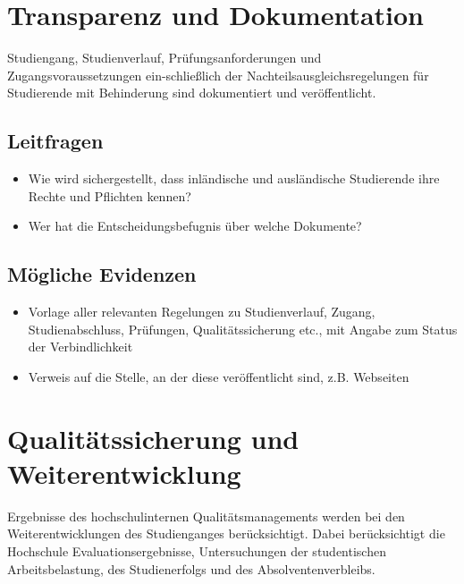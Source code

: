 %

\chapter{Transparenz und Dokumentation}\label{Transparenz und Dokumentation}


Studiengang, Studienverlauf, Prüfungsanforderungen und
Zugangsvoraussetzungen ein-schließlich der Nachteilsausgleichsregelungen
für Studierende mit Behinderung sind dokumentiert und veröffentlicht.

\section{Leitfragen}\label{leitfragen}

\begin{itemize}
\item
  Wie wird sichergestellt, dass inländische und ausländische Studierende
  ihre Rechte und Pflichten kennen?
\item
  Wer hat die Entscheidungsbefugnis über welche Dokumente?
\end{itemize}

\section{Mögliche Evidenzen}\label{muxf6gliche-evidenzen}

\begin{itemize}
\item
  Vorlage aller relevanten Regelungen zu Studienverlauf, Zugang,
  Studienabschluss, Prüfungen, Qualitätssicherung etc., mit Angabe zum
  Status der Verbindlichkeit
\item
  Verweis auf die Stelle, an der diese veröffentlicht sind, z.B.
  Webseiten
\end{itemize}

%

\chapter{Qualitätssicherung und Weiterentwicklung}\label{Qualitätssicherung und Weiterentwicklung}


Ergebnisse des hochschulinternen Qualitätsmanagements werden bei den
Weiterentwicklungen des Studienganges berücksichtigt. Dabei
berücksichtigt die Hochschule Evaluationsergebnisse, Untersuchungen der
studentischen Arbeitsbelastung, des Studienerfolgs und des
Absolventenverbleibs.

